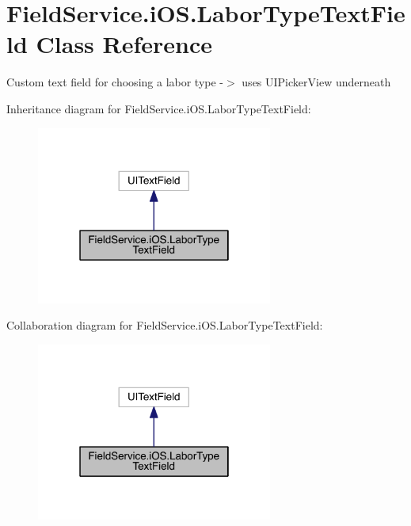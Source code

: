 \hypertarget{class_field_service_1_1i_o_s_1_1_labor_type_text_field}{\section{Field\+Service.\+i\+O\+S.\+Labor\+Type\+Text\+Field Class Reference}
\label{class_field_service_1_1i_o_s_1_1_labor_type_text_field}
}


Custom text field for choosing a labor type -\/$>$ uses U\+I\+Picker\+View underneath  




Inheritance diagram for Field\+Service.\+i\+O\+S.\+Labor\+Type\+Text\+Field\+:
\nopagebreak
\begin{figure}[H]
\begin{center}
\leavevmode
\includegraphics[width=220pt]{class_field_service_1_1i_o_s_1_1_labor_type_text_field__inherit__graph}
\end{center}
\end{figure}


Collaboration diagram for Field\+Service.\+i\+O\+S.\+Labor\+Type\+Text\+Field\+:
\nopagebreak
\begin{figure}[H]
\begin{center}
\leavevmode
\includegraphics[width=220pt]{class_field_service_1_1i_o_s_1_1_labor_type_text_field__coll__graph}
\end{center}
\end{figure}
